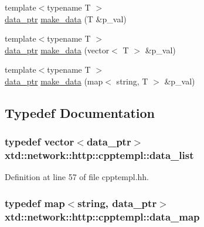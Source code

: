 \begin{DoxyCompactItemize}
\item 
{\footnotesize template$<$typename T $>$ }\\\hyperlink{namespacextd_1_1network_1_1http_1_1cpptempl_ad2f49991f1902699a98cf62bf0ae7ce6}{data\-\_\-ptr} \hyperlink{namespacextd_1_1network_1_1http_1_1cpptempl_a290ac1d88dd4e0bcc65f955fb26e47c8}{make\-\_\-data} (T \&p\-\_\-val)
\item 
{\footnotesize template$<$typename T $>$ }\\\hyperlink{namespacextd_1_1network_1_1http_1_1cpptempl_ad2f49991f1902699a98cf62bf0ae7ce6}{data\-\_\-ptr} \hyperlink{namespacextd_1_1network_1_1http_1_1cpptempl_af97e4f705fc7cb54a179fe88293b2bd7}{make\-\_\-data} (vector$<$ T $>$ \&p\-\_\-val)
\item 
{\footnotesize template$<$typename T $>$ }\\\hyperlink{namespacextd_1_1network_1_1http_1_1cpptempl_ad2f49991f1902699a98cf62bf0ae7ce6}{data\-\_\-ptr} \hyperlink{namespacextd_1_1network_1_1http_1_1cpptempl_a9cfccbb6229825a04791ed3001f6500e}{make\-\_\-data} (map$<$ string, T $>$ \&p\-\_\-val)
\end{DoxyCompactItemize}


\subsection{Typedef Documentation}
\hypertarget{namespacextd_1_1network_1_1http_1_1cpptempl_aff1b51bcf8064f69c85dd4833c1853b4}{
\subsubsection[{data\-\_\-list}]{\setlength{\rightskip}{0pt plus 5cm}typedef vector$<${\bf data\-\_\-ptr}$>$ {\bf xtd\-::network\-::http\-::cpptempl\-::data\-\_\-list}}}\label{namespacextd_1_1network_1_1http_1_1cpptempl_aff1b51bcf8064f69c85dd4833c1853b4}


Definition at line 57 of file cpptempl.\-hh.

\hypertarget{namespacextd_1_1network_1_1http_1_1cpptempl_a638d1d81c8fb63c0bbafd508d6a2a007}{
\subsubsection[{data\-\_\-map}]{\setlength{\rightskip}{0pt plus 5cm}typedef map$<$string, {\bf data\-\_\-ptr}$>$ {\bf xtd\-::network\-::http\-::cpptempl\-::data\-\_\-map}}}\label{namespacextd_1_1network_1_1http_1_1cpptempl_a638d1d81c8fb63c0bbafd508d6a2a007}


